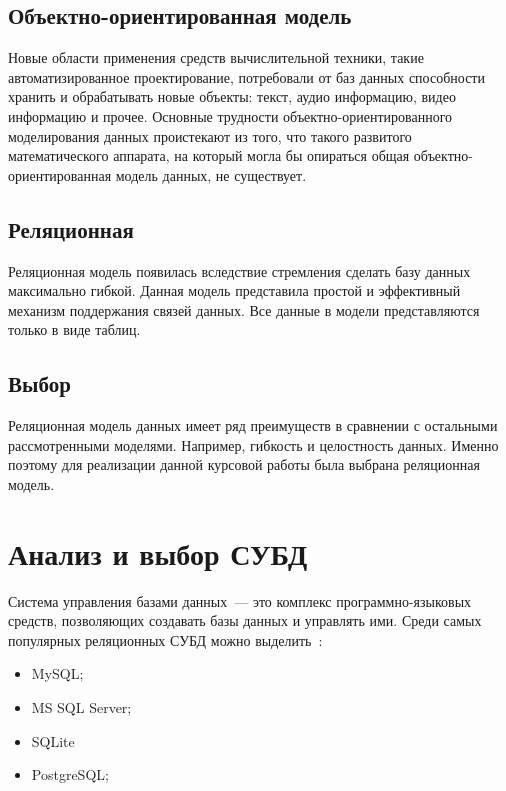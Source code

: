 \subsection{Объектно-ориентированная модель}%
\label{sub:ob_ektno_orientirovannaia_model_}

Новые области применения средств вычислительной техники, такие автоматизированное проектирование, потребовали от баз данных способности хранить и обрабатывать новые объекты: текст, аудио информацию, видео информацию и прочее. Основные трудности объектно-ориентированного моделирования данных проистекают из того, что такого развитого математического аппарата, на который могла бы опираться общая объектно-ориентированная модель данных, не существует.

\subsection{Реляционная}%
\label{sub:reliatsionnaia}

Реляционная модель появилась вследствие стремления сделать базу данных максимально гибкой. Данная модель представила простой и эффективный механизм поддержания связей данных. Все данные в модели представляются только в виде таблиц.

\subsection{Выбор}%
\label{sub:vybor_db}

Реляционная модель данных имеет ряд преимуществ в сравнении с остальными рассмотренными моделями. Например, гибкость и целостность данных. Именно поэтому для реализации данной курсовой работы была выбрана реляционная модель.

\section{Анализ и выбор СУБД}%
\label{sec:analiz_i_vybor_subd}

Система управления базами данных~--- это комплекс программно-языковых средств, позволяющих создавать базы данных и управлять ими. Среди самых популярных реляционных СУБД можно выделить~\cite{subd}:
\begin{itemize}
    \item MySQL;
    \item MS SQL Server;
    \item SQLite
    \item PostgreSQL;
\end{itemize}

